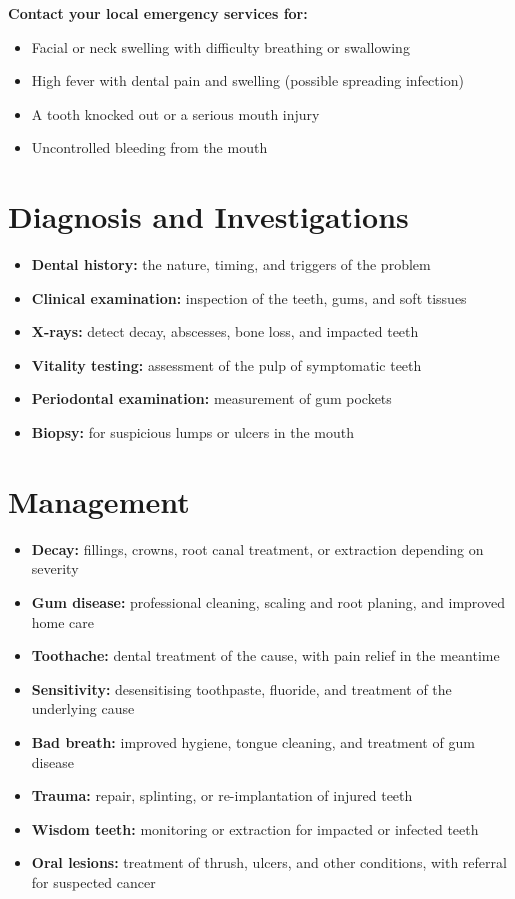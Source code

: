 \textbf{Contact your local emergency services for:}
\begin{itemize}
    \item Facial or neck swelling with difficulty breathing or swallowing
    \item High fever with dental pain and swelling (possible spreading infection)
    \item A tooth knocked out or a serious mouth injury
    \item Uncontrolled bleeding from the mouth
\end{itemize}

\section*{Diagnosis and Investigations}
\begin{itemize}
    \item \textbf{Dental history:} the nature, timing, and triggers of the problem
    \item \textbf{Clinical examination:} inspection of the teeth, gums, and soft tissues
    \item \textbf{X-rays:} detect decay, abscesses, bone loss, and impacted teeth
    \item \textbf{Vitality testing:} assessment of the pulp of symptomatic teeth
    \item \textbf{Periodontal examination:} measurement of gum pockets
    \item \textbf{Biopsy:} for suspicious lumps or ulcers in the mouth
\end{itemize}

\section*{Management}
\begin{itemize}
    \item \textbf{Decay:} fillings, crowns, root canal treatment, or extraction depending on severity
    \item \textbf{Gum disease:} professional cleaning, scaling and root planing, and improved home care
    \item \textbf{Toothache:} dental treatment of the cause, with pain relief in the meantime
    \item \textbf{Sensitivity:} desensitising toothpaste, fluoride, and treatment of the underlying cause
    \item \textbf{Bad breath:} improved hygiene, tongue cleaning, and treatment of gum disease
    \item \textbf{Trauma:} repair, splinting, or re-implantation of injured teeth
    \item \textbf{Wisdom teeth:} monitoring or extraction for impacted or infected teeth
    \item \textbf{Oral lesions:} treatment of thrush, ulcers, and other conditions, with referral for suspected cancer
\end{itemize}

